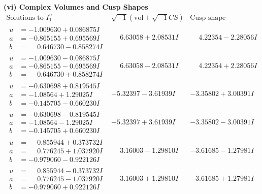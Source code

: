 \documentclass[1p]{elsarticle_modified}
\theoremstyle{definition}
\newcommand{\I}{\sqrt{-1}}
\begin{document}
\newpage\flushleft \textbf{(vi) Complex Volumes and Cusp Shapes}
$$\begin{array}{c|c|c}  
\text{Solutions to }I^u_{1}& \I (\text{vol} + \sqrt{-1}CS) & \text{Cusp shape}\\
 \hline 
\begin{aligned}
u &= -1.009630 + 0.086875 I \\
a &= -0.865155 + 0.695569 I \\
b &= \phantom{-}0.646730 - 0.858274 I\end{aligned}
 & \phantom{-}6.63058 + 2.08531 I & \phantom{-}4.22354 - 2.28056 I \\ \hline\begin{aligned}
u &= -1.009630 - 0.086875 I \\
a &= -0.865155 - 0.695569 I \\
b &= \phantom{-}0.646730 + 0.858274 I\end{aligned}
 & \phantom{-}6.63058 - 2.08531 I & \phantom{-}4.22354 + 2.28056 I \\ \hline\begin{aligned}
u &= -0.630698 + 0.819545 I \\
a &= -1.08564 + 1.29025 I \\
b &= -0.145705 - 0.660230 I\end{aligned}
 & -5.32397 - 3.61939 I & -3.35802 + 3.00391 I \\ \hline\begin{aligned}
u &= -0.630698 - 0.819545 I \\
a &= -1.08564 - 1.29025 I \\
b &= -0.145705 + 0.660230 I\end{aligned}
 & -5.32397 + 3.61939 I & -3.35802 - 3.00391 I \\ \hline\begin{aligned}
u &= \phantom{-}0.855944 + 0.373732 I \\
a &= \phantom{-}0.776245 + 1.037920 I \\
b &= -0.979060 - 0.922126 I\end{aligned}
 & \phantom{-}3.16003 - 1.29810 I & -3.61685 - 1.27981 I \\ \hline\begin{aligned}
u &= \phantom{-}0.855944 - 0.373732 I \\
a &= \phantom{-}0.776245 - 1.037920 I \\
b &= -0.979060 + 0.922126 I\end{aligned}
 & \phantom{-}3.16003 + 1.29810 I & -3.61685 + 1.27981 I \\ \hline\begin{aligned}

\end{aligned}
\end{array}$$
\end{document}
